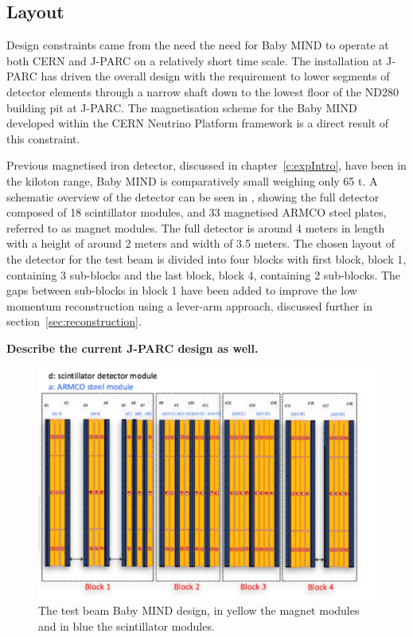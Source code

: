 \subsection{Layout}
Design constraints came from the need the need for Baby MIND to operate at both CERN and J-PARC on a relatively short time scale. The installation at J-PARC has driven the overall design with the requirement to lower segments of detector elements through a narrow shaft down to the lowest floor of the ND280 building pit at J-PARC. The magnetisation scheme for the Baby MIND developed within the CERN Neutrino Platform framework is a direct result of this constraint.

Previous magnetised iron detector, discussed in chapter~\ref{c:expIntro}, have been in the kiloton range, Baby MIND is comparatively small weighing only 65 t. A schematic overview of the detector can be seen in , showing the full detector composed of 18 scintillator modules, and 33 magnetised ARMCO steel plates, referred to as magnet modules. The full detector is around 4 meters in length with a height of around 2 meters and width of 3.5 meters. The chosen layout of the detector for the test beam is divided into four blocks with first block, block 1, containing 3 sub-blocks and the last block, block 4, containing 2 sub-blocks. The gaps between sub-blocks in block 1 have been added to improve the low momentum reconstruction using a lever-arm approach, discussed further in section~\ref{sec:reconstruction}.

\textbf{Describe the current J-PARC design as well.}


\begin{figure}[h!]
\centering
\includegraphics[width=\textwidth]{figures/MIND.jpeg}
\caption{The test beam Baby MIND design, in yellow the magnet modules and in blue the scintillator modules.}
\label{fig:design}
\end{figure}

